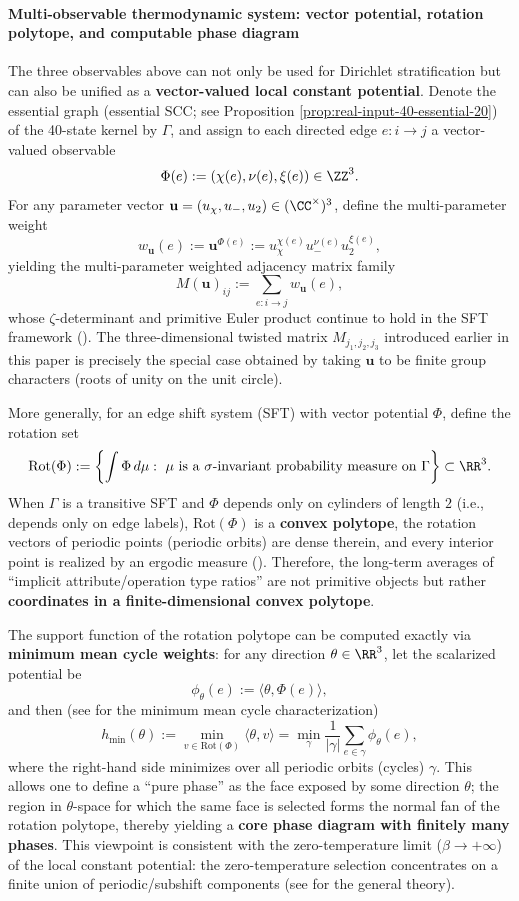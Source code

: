 \paragraph{Multi-observable thermodynamic system: vector potential, rotation polytope, and computable phase diagram}
The three observables above can not only be used for Dirichlet stratification but can also be unified as a \textbf{vector-valued local constant potential}. Denote the essential graph (essential SCC; see Proposition \ref{prop:real-input-40-essential-20}) of the 40-state kernel by $\Gamma$, and assign to each directed edge $e:i\to j$ a vector-valued observable
$$
\Phi(e):=(\chi(e),\nu(e),\xi(e))\in\ZZ^3.
$$
For any parameter vector $\mathbf{u}=(u_\chi,u_-,u_2)\in(\CC^\times)^3$, define the multi-parameter weight
$$
w_{\mathbf{u}}(e):=\mathbf{u}^{\Phi(e)}:=u_\chi^{\chi(e)}u_-^{\nu(e)}u_2^{\xi(e)},
$$
yielding the multi-parameter weighted adjacency matrix family
$$
M(\mathbf{u})_{ij}:=\sum_{e:i\to j} w_{\mathbf{u}}(e),
$$
whose $\zeta$-determinant and primitive Euler product continue to hold in the SFT framework (\cite{BrinStuck2002,ParryPollicott1990Zeta}). The three-dimensional twisted matrix $M_{j_1,j_2,j_3}$ introduced earlier in this paper is precisely the special case obtained by taking $\mathbf{u}$ to be finite group characters (roots of unity on the unit circle).

More generally, for an edge shift system (SFT) with vector potential $\Phi$, define the rotation set
$$
\mathrm{Rot}(\Phi)
:=
\left\{\int \Phi\,d\mu:\ \mu\ \text{is a}\ \sigma\text{-invariant probability measure on}\ \Gamma\right\}\subset\RR^3.
$$
When $\Gamma$ is a transitive SFT and $\Phi$ depends only on cylinders of length $2$ (i.e., depends only on edge labels), $\mathrm{Rot}(\Phi)$ is a \textbf{convex polytope}, the rotation vectors of periodic points (periodic orbits) are dense therein, and every interior point is realized by an ergodic measure (\cite{Ziemian1995RotationSFT}). Therefore, the long-term averages of ``implicit attribute/operation type ratios'' are not primitive objects but rather \textbf{coordinates in a finite-dimensional convex polytope}.

The support function of the rotation polytope can be computed exactly via \textbf{minimum mean cycle weights}: for any direction $\theta\in\RR^3$, let the scalarized potential be
$$
\phi_\theta(e):=\langle\theta,\Phi(e)\rangle,
$$
and then (see \cite{Karp1978MinCycleMean} for the minimum mean cycle characterization)
$$
h_{\min}(\theta):=\min_{v\in\mathrm{Rot}(\Phi)}\langle\theta,v\rangle
=\min_{\gamma}\frac{1}{|\gamma|}\sum_{e\in\gamma}\phi_\theta(e),
$$
where the right-hand side minimizes over all periodic orbits (cycles) $\gamma$. This allows one to define a ``pure phase'' as the face exposed by some direction $\theta$; the region in $\theta$-space for which the same face is selected forms the normal fan of the rotation polytope, thereby yielding a \textbf{core phase diagram with finitely many phases}. This viewpoint is consistent with the zero-temperature limit ($\beta\to+\infty$) of the local constant potential: the zero-temperature selection concentrates on a finite union of periodic/subshift components (see \cite{ChazottesGambaudoUgalde2011ZeroTempLocConst} for the general theory).

